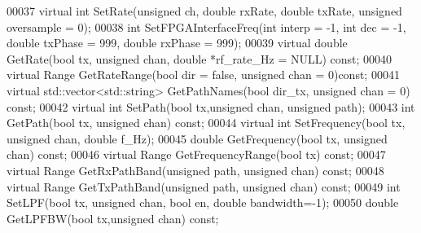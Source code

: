 \begin{DoxyCode}
00037     \textcolor{keyword}{virtual} \textcolor{keywordtype}{int} SetRate(\textcolor{keywordtype}{unsigned} ch, \textcolor{keywordtype}{double} rxRate, \textcolor{keywordtype}{double} txRate, \textcolor{keywordtype}{unsigned} 
      oversample = 0);
00038     \textcolor{keywordtype}{int} SetFPGAInterfaceFreq(\textcolor{keywordtype}{int} interp = -1, \textcolor{keywordtype}{int} dec = -1, \textcolor{keywordtype}{double} txPhase = 999, \textcolor{keywordtype}{double} rxPhase = 999);
00039     \textcolor{keyword}{virtual} \textcolor{keywordtype}{double} GetRate(\textcolor{keywordtype}{bool} tx, \textcolor{keywordtype}{unsigned} chan, \textcolor{keywordtype}{double} *rf\_rate\_Hz = NULL) \textcolor{keyword}{const};
00040     \textcolor{keyword}{virtual} Range GetRateRange(\textcolor{keywordtype}{bool} dir = \textcolor{keyword}{false}, \textcolor{keywordtype}{unsigned} chan = 0)\textcolor{keyword}{const};
00041     \textcolor{keyword}{virtual} std::vector<std::string> GetPathNames(\textcolor{keywordtype}{bool} dir_tx, \textcolor{keywordtype}{unsigned} chan = 0) \textcolor{keyword}{const};
00042     \textcolor{keyword}{virtual} \textcolor{keywordtype}{int} SetPath(\textcolor{keywordtype}{bool} tx,\textcolor{keywordtype}{unsigned} chan, \textcolor{keywordtype}{unsigned} path);
00043     \textcolor{keywordtype}{int} GetPath(\textcolor{keywordtype}{bool} tx, \textcolor{keywordtype}{unsigned} chan) \textcolor{keyword}{const};
00044     \textcolor{keyword}{virtual} \textcolor{keywordtype}{int} SetFrequency(\textcolor{keywordtype}{bool} tx, \textcolor{keywordtype}{unsigned} chan, \textcolor{keywordtype}{double} f\_Hz);
00045     \textcolor{keywordtype}{double} GetFrequency(\textcolor{keywordtype}{bool} tx, \textcolor{keywordtype}{unsigned} chan) \textcolor{keyword}{const};
00046     \textcolor{keyword}{virtual} Range GetFrequencyRange(\textcolor{keywordtype}{bool} tx) \textcolor{keyword}{const};
00047     \textcolor{keyword}{virtual} Range GetRxPathBand(\textcolor{keywordtype}{unsigned} path, \textcolor{keywordtype}{unsigned} chan) \textcolor{keyword}{const};
00048     \textcolor{keyword}{virtual} Range GetTxPathBand(\textcolor{keywordtype}{unsigned} path, \textcolor{keywordtype}{unsigned} chan) \textcolor{keyword}{const};
00049     \textcolor{keywordtype}{int} SetLPF(\textcolor{keywordtype}{bool} tx, \textcolor{keywordtype}{unsigned} chan, \textcolor{keywordtype}{bool} en, \textcolor{keywordtype}{double} bandwidth=-1);
00050     \textcolor{keywordtype}{double} GetLPFBW(\textcolor{keywordtype}{bool} tx,\textcolor{keywordtype}{unsigned} chan) \textcolor{keyword}{const};

\end{DoxyCode}
